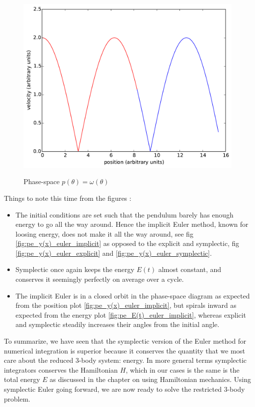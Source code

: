\begin{figure}
{            \includegraphics[scale=0.24]{fig/pe/pe_phase-space_euler_symplectic.pdf}
            \label{fig:pe_phase-space_euler_symplectic}
        }
        \caption{Phase-space $p(\theta) = \omega(\theta)$}
    \label{fig:pe_phase-space_euler}
\end{figure}
Things to note this time from the figures :
\begin{itemize}
    \item The initial conditions are set such that the pendulum barely has enough energy to go all the way around. Hence the implicit Euler method, known for loosing energy, does not make it all the way around, see fig \ref{fig:pe_y(x)_euler_implicit} as opposed to the explicit and symplectic, fig \ref{fig:pe_y(x)_euler_explicit} and \ref{fig:pe_y(x)_euler_symplectic}.
    \item Symplectic once again keeps the energy $E(t)$ almost constant, and conserves it seemingly perfectly on average over a cycle.
    \item The implicit Euler is in a closed orbit in the phase-space diagram as expected from the position plot \ref{fig:pe_y(x)_euler_implicit}, but spirals inward as expected from the energy plot \ref{fig:pe_E(t)_euler_implicit}, whereas explicit and symplectic steadily increases their angles from the initial angle.
\end{itemize}
To summarize, we have seen that the symplectic version of the Euler method for numerical integration is superior because it conserves the quantity that we most care about the reduced 3-body system: energy. In more general terms symplectic integrators conserves the Hamiltonian $H$, which in our cases is the same is the total energy $E$ as discussed in the chapter on using Hamiltonian mechanics. Using symplectic Euler going forward, we are now ready to solve the restricted 3-body problem.
